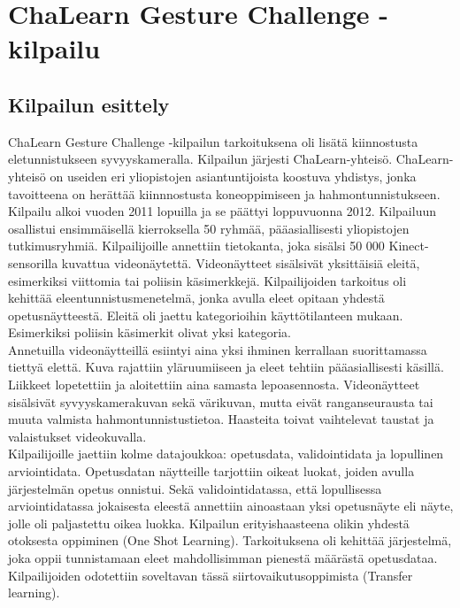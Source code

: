 \section{ChaLearn Gesture Challenge -kilpailu}
\label{ChaLearn Gesture Challenge -kilpailu}

\subsection{Kilpailun esittely}
ChaLearn Gesture Challenge -kilpailun tarkoituksena oli lisätä kiinnostusta eletunnistukseen syvyyskameralla.
Kilpailun järjesti ChaLearn-yhteisö. ChaLearn-yhteisö on useiden eri yliopistojen asiantuntijoista koostuva yhdistys,
jonka tavoitteena on herättää kiinnnostusta koneoppimiseen ja hahmontunnistukseen. \citep{kilpailunnettisivut} Kilpailu alkoi vuoden 2011 lopuilla ja se päättyi loppuvuonna 2012. Kilpailuun osallistui ensimmäisellä kierroksella 50 ryhmää,
pääasiallisesti yliopistojen tutkimusryhmiä. Kilpailijoille annettiin tietokanta, joka sisälsi 50 000 Kinect-sensorilla kuvattua videonäytettä. 
Videonäytteet sisälsivät yksittäisiä eleitä, esimerkiksi viittomia tai poliisin käsimerkkejä. Kilpailijoiden tarkoitus oli kehittää eleentunnistusmenetelmä, 
jonka avulla eleet opitaan yhdestä opetusnäytteestä. Eleitä oli jaettu kategorioihin käyttötilanteen mukaan. Esimerkiksi poliisin käsimerkit olivat yksi kategoria.
\citep{6239178} \\

Annetuilla videonäytteillä esiintyi aina yksi ihminen kerrallaan suorittamassa tiettyä elettä. Kuva rajattiin yläruumiiseen ja eleet tehtiin
pääasiallisesti käsillä. Liikkeet lopetettiin ja aloitettiin aina samasta lepoasennosta. Videonäytteet sisälsivät syvyyskamerakuvan sekä värikuvan, 
mutta eivät ranganseurausta tai muuta valmista hahmontunnistustietoa. Haasteita toivat vaihtelevat taustat ja valaistukset videokuvalla.  \citep{6239178}\\

Kilpailijoille jaettiin kolme datajoukkoa: opetusdata, validointidata ja lopullinen arviointidata. 
Opetusdatan näytteille tarjottiin oikeat luokat, joiden avulla järjestelmän opetus onnistui.
Sekä validointidatassa, että lopullisessa arviointidatassa jokaisesta eleestä annettiin ainoastaan yksi opetusnäyte eli näyte,
jolle oli paljastettu oikea luokka. Kilpailun erityishaasteena olikin yhdestä otoksesta oppiminen (One Shot Learning). 
Tarkoituksena oli kehittää järjestelmä, joka oppii tunnistamaan eleet mahdollisimman pienestä määrästä opetusdataa. 
Kilpailijoiden odotettiin soveltavan tässä siirtovaikutusoppimista (Transfer learning). \citep{6239178} \\

